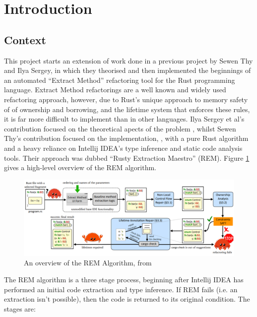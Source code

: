 \section{Introduction}

\subsection*{Context}

This project starts an extension of work done in a previous project by Sewen Thy and
Ilya Sergey, in which they theorised and then implemented the beginnings of an
automated ``Extract Method'' refactoring tool for the Rust programming language.
Extract Method refactorings are a well known and widely used refactoring
approach, however, due to Rust's unique approach to memory safety of of
ownership and borrowing, and the lifetime system that enforces these rules, it
is far more difficult to implement than in other languages. Ilya Sergey et al's
contribution focused on the theoretical apects of the problem
\cite{AdventureOfALifetime}, whilst Sewen Thy's contribution focused on the
implementation, \cite{BorrowingWithoutSorrowing}, with a pure Rust algorithm and
a heavy reliance on Intellij IDEA's type inference and static code analysis
tools. Their approach was dubbed ``Rusty Extraction Maestro'' (REM). Figure
\ref{fig:rem-overview} gives a high-level overview
of the REM algorithm.

\begin{figure}[h]
    \centering
    \includegraphics[width=\columnwidth]{Figures/rem-overview.png}
    \caption{An overview of the REM Algorithm, from \cite{AdventureOfALifetime}}
    \label{fig:rem-overview}
\end{figure}

The REM algorithm is a three stage process, beginning after Intellij IDEA has
performed an initial code extraction and type inference. If REM fails (i.e. an
extraction isn't possible), then the code is returned to its original condition.
The stages are:

